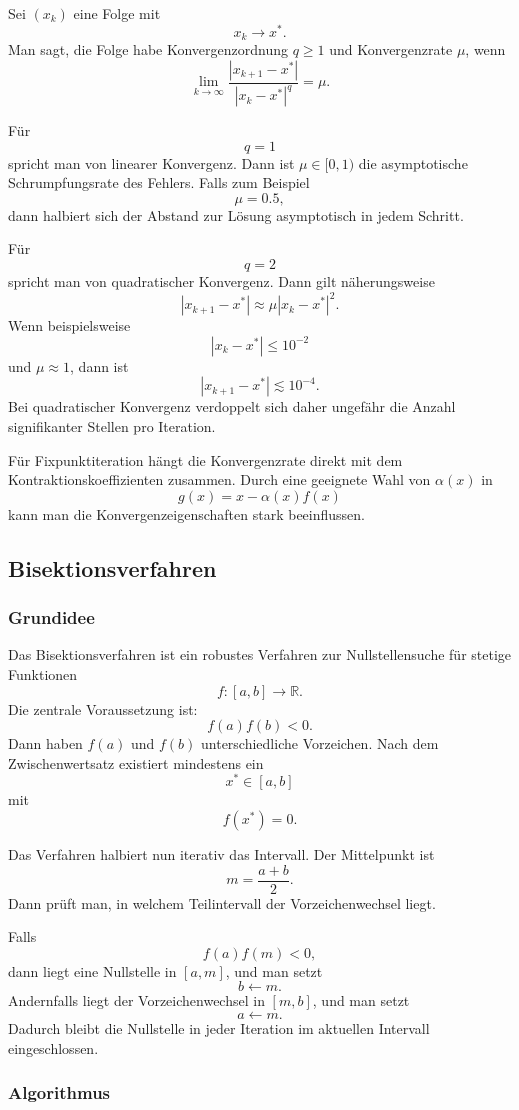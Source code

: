\documentclass[10pt, letterpaper]{article}
\begin{document}
Sei \((x_k)\) eine Folge mit
\[
x_k\to x^\ast.
\]
Man sagt, die Folge habe Konvergenzordnung \(q\geq 1\) und Konvergenzrate \(\mu\), wenn
\[
\boxed{
\lim_{k\to\infty}
\frac{|x_{k+1}-x^\ast|}
{|x_k-x^\ast|^q}
=
\mu.
}
\]

Für
\[
q=1
\]
spricht man von linearer Konvergenz. Dann ist \(\mu\in[0,1)\) die asymptotische Schrumpfungsrate des Fehlers. Falls zum Beispiel
\[
\mu=0.5,
\]
dann halbiert sich der Abstand zur Lösung asymptotisch in jedem Schritt.

Für
\[
q=2
\]
spricht man von quadratischer Konvergenz. Dann gilt näherungsweise
\[
|x_{k+1}-x^\ast|
\approx
\mu |x_k-x^\ast|^2.
\]
Wenn beispielsweise
\[
|x_k-x^\ast|\leq 10^{-2}
\]
und \(\mu\approx 1\), dann ist
\[
|x_{k+1}-x^\ast|\lesssim 10^{-4}.
\]
Bei quadratischer Konvergenz verdoppelt sich daher ungefähr die Anzahl signifikanter Stellen pro Iteration.

Für Fixpunktiteration hängt die Konvergenzrate direkt mit dem Kontraktionskoeffizienten zusammen. Durch eine geeignete Wahl von \(\alpha(x)\) in
\[
g(x)=x-\alpha(x)f(x)
\]
kann man die Konvergenzeigenschaften stark beeinflussen.

\subsection{Bisektionsverfahren}

\subsubsection{Grundidee}

Das Bisektionsverfahren ist ein robustes Verfahren zur Nullstellensuche für stetige Funktionen
\[
f:[a,b]\to\mathbb{R}.
\]
Die zentrale Voraussetzung ist:
\[
f(a)f(b)<0.
\]
Dann haben \(f(a)\) und \(f(b)\) unterschiedliche Vorzeichen. Nach dem Zwischenwertsatz existiert mindestens ein
\[
x^\ast\in[a,b]
\]
mit
\[
f(x^\ast)=0.
\]

Das Verfahren halbiert nun iterativ das Intervall. Der Mittelpunkt ist
\[
m=\frac{a+b}{2}.
\]
Dann prüft man, in welchem Teilintervall der Vorzeichenwechsel liegt.

Falls
\[
f(a)f(m)<0,
\]
dann liegt eine Nullstelle in \([a,m]\), und man setzt
\[
b\leftarrow m.
\]
Andernfalls liegt der Vorzeichenwechsel in \([m,b]\), und man setzt
\[
a\leftarrow m.
\]
Dadurch bleibt die Nullstelle in jeder Iteration im aktuellen Intervall eingeschlossen.

\subsubsection{Algorithmus}
\end{document}
